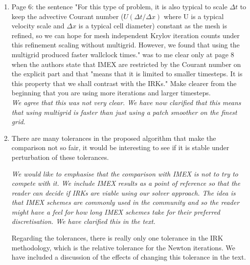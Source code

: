 \documentclass[a4paper,12pt]{article}
\begin{document}
\begin{enumerate}
\item Page 6: the sentence "For this type of problem, it is also
  typical to scale $\Delta t$ to keep the advective Courant number
  ($U(\Delta t/\Delta x) $ where U is a typical velocity scale and
  $\Delta x$ is a typical cell diameter) constant as the mesh is
  refined, so we can hope for mesh independent Krylov iteration counts
  under this refinement scaling without multigrid. However, we found
  that using the multigrid produced faster wallclock times." was to me
  clear only at page 8 when the authors state that IMEX are restricted
  by the Courant number on the explicit part and that "means that it
  is limited to smaller timesteps. It is this property that we shall
  contrast with the IRKs." Make clearer from the beginning that you
  are using more iterations and larger timesteps.\\
  \emph{We agree that this was not very clear. We have now clarified
  that this means that using multigrid is faster than just using
  a patch smoother on the finest grid.}
\item There are many tolerances in the proposed algorithm that make the comparison not so fair, it would be interesting to see if it is stable under perturbation of these tolerances.\\
{\itshape
  We would like to emphasise that the comparison with IMEX is
  not to try to compete with it. We include IMEX results as a point of
  reference so that the reader can decide if IRKs are viable using our
  solver approach. The idea is that IMEX schemes are commonly used in
  the community and so the reader might have a feel for how long IMEX
  schemes take for their preferred discretisation. We have clarified this
  in the text.

  Regarding the tolerances, there is really only one tolerance in the
  IRK methodology, which is the relative tolerance for the Newton
  iterations.
  We have included a discussion of the effects of changing this tolerance in
  the text.
  
}
\end{enumerate}
\end{document}

